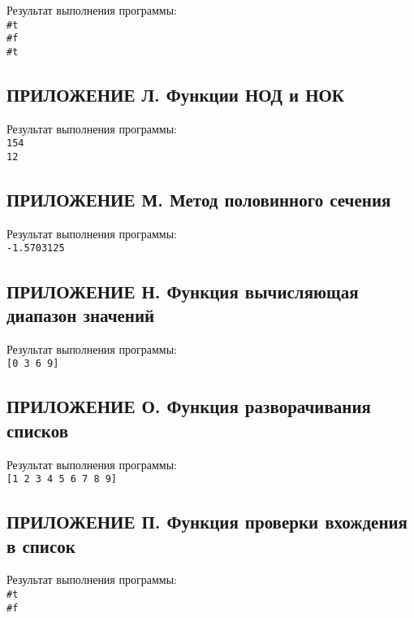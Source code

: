     Результат выполнения программы:
    \\ \verb,#t,
    \\ \verb,#f,
    \\ \verb,#t,

    \subsection*{ПРИЛОЖЕНИЕ Л. Функции НОД и НОК}
    

    Результат выполнения программы:
    \\ \verb,154,
    \\ \verb,12,

    \subsection*{ПРИЛОЖЕНИЕ М. Метод половинного сечения}
    

    Результат выполнения программы:
    \\ \verb,-1.5703125,

    \subsection*{ПРИЛОЖЕНИЕ Н. Функция вычисляющая диапазон значений}
    

    Результат выполнения программы:
    \\ \verb,[0 3 6 9],

    \subsection*{ПРИЛОЖЕНИЕ О. Функция разворачивания списков}
    

    Результат выполнения программы:
    \\ \verb,[1 2 3 4 5 6 7 8 9],

    \subsection*{ПРИЛОЖЕНИЕ П. Функция проверки вхождения в список}
    

    Результат выполнения программы:
    \\ \verb,#t,
    \\ \verb,#f,

    